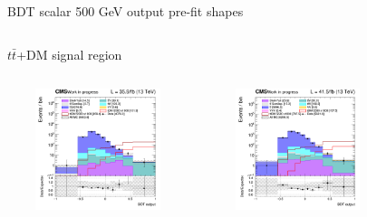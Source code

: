 \documentclass[8pt]{beamer}
\begin{document}
\begin{frame}{BDT scalar 500 GeV output pre-fit shapes}
\vspace{-8pt}
\begin{columns}
\begin{column}{1.09\textwidth}
\begin{block}{\centering $t \bar t$+DM signal region}\end{block} \vspace{10pt}
\end{column}
\end{columns} \vspace{-16pt}
\begin{columns}
		\begin{column}{0.33\textwidth}
			\begin{center}
     			\includegraphics[width=1.0\textwidth, height=100pt]{figs/2016/SmearSR-ttDM-scalar500/log_cratio_TTbar_topCR_ll_BDT_ttDM500_TTbar_BDT_output_scalar500_customBinsAttempt7.png}
    		\end{center}		
		\end{column}
		\begin{column}{0.33\textwidth}
			\begin{center}
     			\includegraphics[width=1.0\textwidth, height=100pt]{figs/2017/SmearSR-ttDM-scalar500/log_cratio_TTbar_topCR_ll_BDT_ttDM500_TTbar_BDT_output_scalar500_customBinsAttempt7.png}
    		\end{center}		
		\end{column}
		\begin{column}{0.33\textwidth}
			\begin{center}

\end{center}
\end{column}
\end{columns}
\end{frame}
\end{document}
